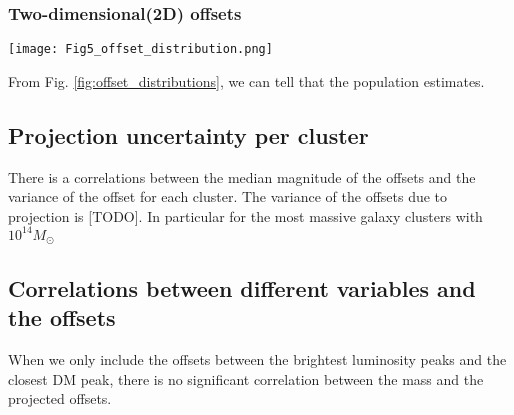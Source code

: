 \subsubsection{Two-dimensional(2D) offsets}
\begin{figure*}
	\begin{center}
	\texttt{[image: Fig5\_offset\_distribution.png]}
	\caption{ 		
		The distribution of different offsets of [TODO] clusters with [TODO]
		projections. The dark blue area indicates the 68\% confidence interval
		while the light blue area shows the 95\% confidence interval. 
		We plot the offset after taking the
		absolute magnitude, which  
		The estimates from the absolute magnitude of the
		offsets are pushed towards larger values. 				
		\label{fig:offset_distributions}
	}
\end{center}
\end{figure*}

From Fig. \ref{fig:offset_distributions}, we can tell that the population 
estimates. 


\subsection{Projection uncertainty per cluster}
There is a correlations between the median magnitude of the offsets and the
variance of the offset for each cluster.
The variance of the offsets due to projection is [TODO].
In particular for the most massive galaxy clusters with $10^{14} M_{\odot}$
 
\subsection{Correlations between different variables and the offsets}

When we only include the offsets between the brightest luminosity peaks and the
closest DM peak, there is no significant correlation between the mass and 
the projected offsets.




% 
 
